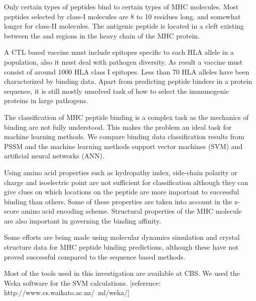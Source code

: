 Only certain types of peptides bind to certain types of MHC molecules. Most peptides selected by class-I molecules are 8 to 10 residues long. 
and somewhat longer for class-II molecules. The antigenic peptide is located in a cleft existing between the  and  regions in the heavy chain of the MHC protein.

A CTL based vaccine must include epitopes specific to each HLA allele in a population, also it must deal with pathogen diversity. As result a vaccine must consist of around 1000 HLA class I epitopes.
Less than 70 HLA alleles have been characterized by binding data. Apart from predicting peptide binders in a protein sequence, it is still  mostly unsolved task of how to select the immunogenic proteins in large pathogens.

The classification of MHC peptide binding is a complex task as the mechanics of binding are not fully understood. 
This makes the problem an ideal task for machine learning methods. We compare binding data classification results from PSSM and the machine learning methods support vector machines (SVM) and artificial neural networks (ANN).

Using amino acid properties such as hydropathy index, side-chain polarity or charge and isoelectric point are not sufficient for classification although they can give clues on which locations on the peptide are more important to successful binding than others. 
Some of these properties are taken into account in the z-score amino acid encoding scheme. Structural properties of the MHC molecule are also important in governing the binding affinity.

Some efforts are being made using molecular dynamics simulation and crystal structure data for MHC peptide binding predictions, although these have not proved successful compared to the sequence based methods.

Most of the tools used in this investigation are available at CBS. We used the Weka software for the SVM calculations. [reference: http://www.cs.waikato.ac.nz/~ml/weka/]

